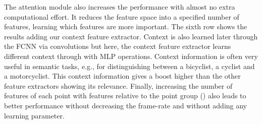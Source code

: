 \documentclass[letterpaper, 10 pt, journal, twoside]{IEEEtran}
\begin{document}
The attention module also increases the performance with almost no extra computational effort. It reduces the feature space into a specified number of features, learning which features are more important.
The sixth row shows the results adding our context feature extractor. Context is also learned later through the FCNN via convolutions but here, the context feature extractor learns different context through with MLP operations. Context information is often very useful in semantic tasks, e.g., for distinguishing between a bicyclist, a cyclist and a motorcyclist. This context information gives a boost higher than the other feature extractors showing its relevance. 
Finally, increasing the number of features of each point with features relative to the point group () also leads  to better performance without decreasing the frame-rate and without adding any learning parameter.
\end{document}
